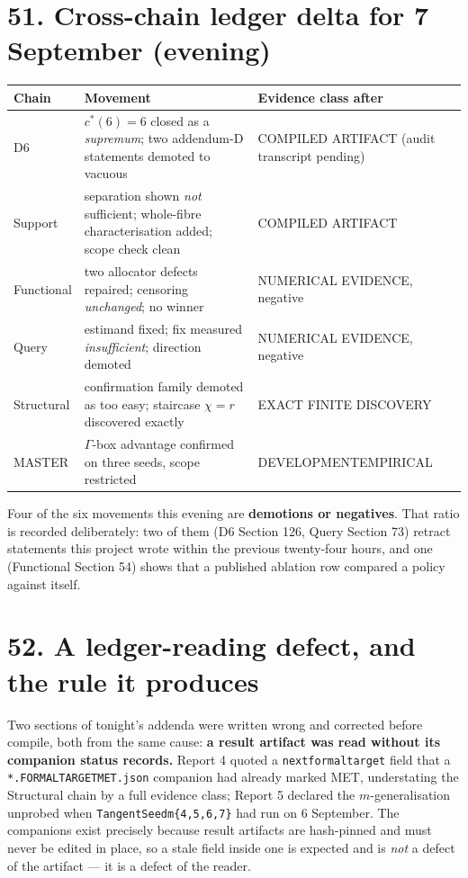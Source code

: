 \documentclass[9pt,twocolumn]{article}
\renewcommand{\_}{\CIGunderscore\allowbreak}
\begin{document}
\section*{51. Cross-chain ledger delta for 7 September (evening)}
\begin{center}\scriptsize
\begin{tabularx}{0.98\columnwidth}{>{\raggedright\arraybackslash}p{}>{\raggedright\arraybackslash}p{}X}
\toprule
Chain & Movement & Evidence class after\\
\midrule
D6 & $c^\ast(6)=6$ closed as a \emph{supremum}; two addendum-D statements demoted to vacuous & COMPILED ARTIFACT (audit transcript pending)\\
Support & separation shown \emph{not} sufficient; whole-fibre characterisation added; scope check clean & COMPILED ARTIFACT\\
Functional & two allocator defects repaired; censoring \emph{unchanged}; no winner & NUMERICAL EVIDENCE, negative\\
Query & estimand fixed; fix measured \emph{insufficient}; direction demoted & NUMERICAL EVIDENCE, negative\\
Structural & confirmation family demoted as too easy; staircase $\chi=r$ discovered exactly & EXACT FINITE DISCOVERY\\
MASTER & $\Gamma$-box advantage confirmed on three seeds, scope restricted & DEVELOPMENT\_EMPIRICAL\\
\bottomrule
\end{tabularx}
\end{center}
Four of the six movements this evening are \textbf{demotions or negatives}. That ratio is recorded deliberately: two of them (D6 Section 126, Query Section 73) retract statements this project wrote within the previous twenty-four hours, and one (Functional Section 54) shows that a published ablation row compared a policy against itself.

\section*{52. A ledger-reading defect, and the rule it produces}
Two sections of tonight's addenda were written wrong and corrected before compile, both from the same cause: \textbf{a result artifact was read without its companion status records.} Report 4 quoted a \texttt{next\_formal\_target} field that a \texttt{*.FORMAL\_TARGET\_MET.json} companion had already marked \textsf{MET}, understating the Structural chain by a full evidence class; Report 5 declared the $m$-generalisation unprobed when \texttt{TangentSeed\_m\{4,5,6,7\}} had run on 6 September. The companions exist precisely because result artifacts are hash-pinned and must never be edited in place, so a stale field inside one is expected and is \emph{not} a defect of the artifact --- it is a defect of the reader.
\end{document}
